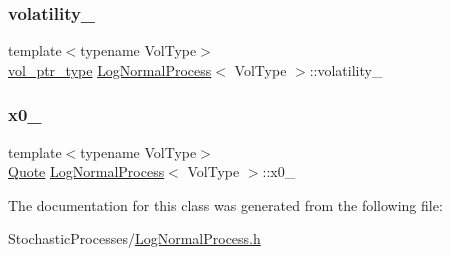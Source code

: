 \hypertarget{class_log_normal_process_a90615a4b65992ad6fb280b18a9a705b3}{}\label{class_log_normal_process_a90615a4b65992ad6fb280b18a9a705b3} 
\subsubsection{\texorpdfstring{volatility\+\_\+}{volatility\_}}
{\footnotesize\ttfamily template$<$typename Vol\+Type$>$ \\
\hyperlink{class_log_normal_process_a904926553c5e4d60e52caf87e1745651}{vol\+\_\+ptr\+\_\+type} \hyperlink{class_log_normal_process}{Log\+Normal\+Process}$<$ Vol\+Type $>$\+::volatility\+\_\+\hspace{0.3cm}{\ttfamily [protected]}}

\hypertarget{class_log_normal_process_aaad6cd95af55b1d573fa384ddb0066ef}{}\label{class_log_normal_process_aaad6cd95af55b1d573fa384ddb0066ef} 
\subsubsection{\texorpdfstring{x0\+\_\+}{x0\_}}
{\footnotesize\ttfamily template$<$typename Vol\+Type$>$ \\
\hyperlink{_name_def_8h_a642a6c5fd87319d922637de0e0bb0305}{Quote} \hyperlink{class_log_normal_process}{Log\+Normal\+Process}$<$ Vol\+Type $>$\+::x0\+\_\+\hspace{0.3cm}{\ttfamily [protected]}}



The documentation for this class was generated from the following file\+:\begin{DoxyCompactItemize}
\item 
Stochastic\+Processes/\hyperlink{_log_normal_process_8h}{Log\+Normal\+Process.\+h}\end{DoxyCompactItemize}

